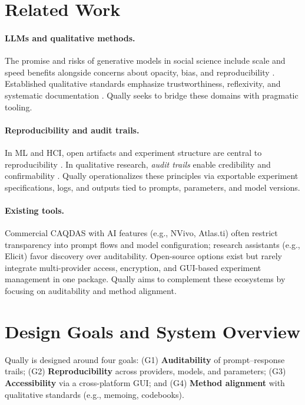\documentclass[11pt,a4paper]{article}
\begin{document}
\section{Related Work}
\label{sec:related}
\paragraph{LLMs and qualitative methods.} The promise and risks of generative models in social science include scale and speed benefits alongside concerns about opacity, bias, and reproducibility \cite{bender2021dangers,bommasani2021opportunities}. Established qualitative standards emphasize trustworthiness, reflexivity, and systematic documentation \cite{lincoln1985naturalistic,braun2006using,miles2014qualitative,charmaz2014constructing}. Qually seeks to bridge these domains with pragmatic tooling.

\paragraph{Reproducibility and audit trails.} In ML and HCI, open artifacts and experiment structure are central to reproducibility \cite{pineau2021improving}. In qualitative research, \emph{audit trails} enable credibility and confirmability \cite{lincoln1985naturalistic}. Qually operationalizes these principles via exportable experiment specifications, logs, and outputs tied to prompts, parameters, and model versions.

\paragraph{Existing tools.} Commercial CAQDAS with AI features (e.g., NVivo, Atlas.ti) often restrict transparency into prompt flows and model configuration; research assistants (e.g., Elicit) favor discovery over auditability. Open-source options exist but rarely integrate multi-provider access, encryption, and GUI-based experiment management in one package. Qually aims to complement these ecosystems by focusing on auditability and method alignment.

\section{Design Goals and System Overview}
\label{sec:overview}
Qually is designed around four goals: (G1) \textbf{Auditability} of prompt--response trails; (G2) \textbf{Reproducibility} across providers, models, and parameters; (G3) \textbf{Accessibility} via a cross-platform GUI; and (G4) \textbf{Method alignment} with qualitative standards (e.g., memoing, codebooks).
\end{document}
